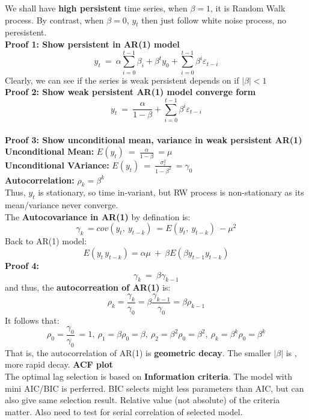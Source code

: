\documentclass[12pt]{article}
\begin{document}
We shall have \textbf{high persistent} time series, when $\beta = 1$, it is Random Walk process. By contrast, when $\beta = 0$, $y_t$ then just follow white noise process, no peresistent. 
\\

\noindent
{\color{Tan} \textbf{Proof 1: Show persistent in  AR(1) model}}\\
$$y_t\ =\ \alpha\sum_{i=0}^{t-1}\beta_i+\beta^ty_0+\sum_{i=0}^{t-1}\beta^i\varepsilon_{t-i}$$
Clearly, we can see if the series is weak persistent depends on if $|\beta| <1$
\\

\noindent
{\color{Tan} \textbf{Proof 2: Show weak persistent AR(1) model converge form}}\\
$$y_t\ =\ \frac{\alpha}{1-\beta}+\sum_{i=0}^{t-1}\beta^i\varepsilon_{t-i}$$
\\

\noindent
{\color{Tan} \textbf{Proof 3: Show unconditional mean, variance in weak persistent AR(1)}}\\
\textbf{Unconditional Mean: }$E\left(y_t\right)\ =\ \frac{\alpha}{1-\beta}\ =\mu$ \\
\textbf{Unconditional VAriance: }$E\left(y_t\right)\ =\ \frac{\sigma_{\varepsilon}^2}{1-\beta^2}\ =\gamma_0$\\
\textbf{Autocorrelation:} $\rho_k=\beta^k$
\\

Thus, $y_t$ is stationary, so time in-variant, but RW process is non-stationary as its mean/variance never converge. 
\\

\noindent
The \textbf{Autocovariance in AR(1)} by defination is:
$$\gamma_{k\ }=cov\left(y_t,\ y_{t-k}\right)\ =E\left(y_t,\ y_{t-k}\right)\ -\mu^2$$
Back to AR(1) model:
$$E\left(y_{t\ }y_{t-k}\right)=\alpha \mu \ +\ \beta E\left(\beta y_{t-1}y_{t-k}\right)$$
\noindent
{\color{Tan} \textbf{Proof 4:}}\\
$$\gamma _k\ =\ \beta \gamma _{k-1}$$
and thus, the \textbf{autocorreation of AR(1)} is:
$$\rho _k=\frac{\gamma _k}{\gamma _0}=\beta \frac{\gamma _{k-1}}{\gamma _0}=\beta \rho _{k-1}$$
It follows that:
$$\rho _0=\frac{\gamma _0}{\gamma _0}\ =1,\ \rho _1=\beta \rho _0=\beta ,\ \rho_2=\beta^2\rho_0=\beta^2,\ \rho_k=\beta^k\rho_0=\beta^k$$
That is, the autocorrelation of AR(1) is \textbf{geometric decay}. The smaller $|\beta|$ is , more rapid decay. \textbf{ACF plot}
\\

The optimal lag selection is based on \textbf{Information criteria}. The model with mini AIC/BIC is perferred. BIC selects might less parameters than AIC, but can also give same selection result. Relative value (not absolute) of the criteria matter. Also need to test for serial correlation of selected model.
\\
\end{document}
